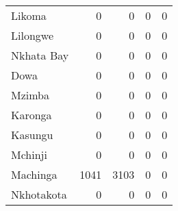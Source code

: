\begin{tabular}{lrrrr}
Likoma     &              0 &              0 &              0 &              0 \\
Lilongwe   &              0 &              0 &              0 &              0 \\
Nkhata Bay &              0 &              0 &              0 &              0 \\
Dowa       &              0 &              0 &              0 &              0 \\
Mzimba     &              0 &              0 &              0 &              0 \\
Karonga    &              0 &              0 &              0 &              0 \\
Kasungu    &              0 &              0 &              0 &              0 \\
Mchinji    &              0 &              0 &              0 &              0 \\
Machinga   &           1041 &           3103 &              0 &              0 \\
Nkhotakota &              0 &              0 &              0 &              0 \\
\bottomrule
\end{tabular}
